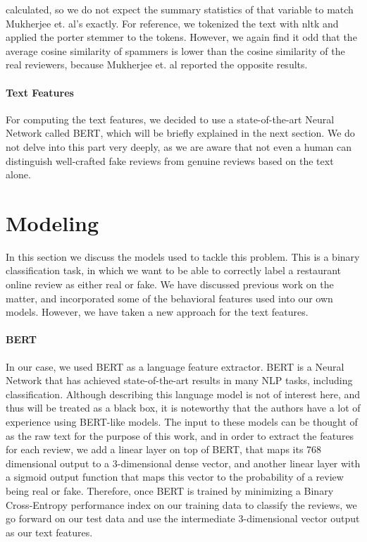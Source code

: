\documentclass[man, floatsintext, 10pt]{apa6}
\begin{document}
calculated, so we do not expect the summary statistics of that variable to match Mukherjee et. al's exactly. For reference, we tokenized the text with nltk and applied the porter stemmer to the tokens. However, we again find it odd that the average cosine similarity of spammers is lower than the cosine similarity  of the real reviewers, because Mukherjee et. al reported the opposite results.
 \vspace{2mm}
 
\paragraph{Text Features} For computing the text features, we decided to use a state-of-the-art Neural Network called BERT, which will be briefly explained in the next section. We do not delve into this part very deeply, as we are aware that not even a human can distinguish well-crafted fake reviews from genuine reviews based on the text alone.


\section{Modeling}

In this section we discuss the models used to tackle this problem. This is a binary classification task, in which we want to be able to correctly label a restaurant online review as either real or fake. We have discussed previous work on the matter, and incorporated some of the behavioral features used into our own models. However, we have taken a new approach for the text features.

\vspace{2mm}

\paragraph{BERT} In our case, we used BERT as a language feature extractor. BERT is a Neural Network that has achieved state-of-the-art results in many NLP tasks, including classification. Although describing this language model is not of interest here, and thus will be treated as a black box, it is noteworthy that the authors have a lot of experience using BERT-like models. The input to these models can be thought of as the raw text for the purpose of this work, and in order to extract the features for each review, we add a linear layer on top of BERT, that maps its 768 dimensional output to a 3-dimensional dense vector, and another linear layer with a sigmoid output function that maps this vector to the probability of a review being real or fake. Therefore, once BERT is trained by minimizing a Binary Cross-Entropy performance index on our training data to classify the reviews, we go forward on our test data and use the intermediate 3-dimensional vector output as our text features. 
\end{document}
